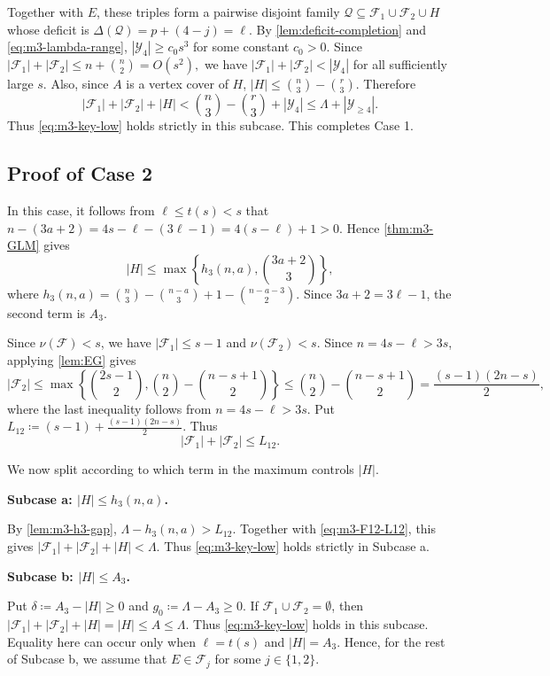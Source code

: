 \documentclass[10pt,a4paper]{article}
\numberwithin{equation}{section}
\theoremstyle{definition}
\newcommand{\F}{\mathcal F}
\newcommand{\Y}{\mathcal Y}
\begin{document}
Together with \(E\), these triples form a pairwise disjoint family
\(\mathcal Q\subseteq\F_1\cup\F_2\cup H\) whose deficit is
\(\Delta(\mathcal Q)=p+(4-j)=\ell.\)
By \cref{lem:deficit-completion} and \eqref{eq:m3-lambda-range},
\(|\Y_4|\ge c_0s^3\) for some constant \(c_0>0\).  Since
\(|\F_1|+|\F_2| \le n+\binom n2 =O(s^2),\)
we have \(|\F_1|+|\F_2|<|\Y_4|\) for all sufficiently large \(s\).  Also,
since \(A\) is a vertex cover of \(H\),
\(|H|\le \binom n3-\binom r3.\)
Therefore
\[
    |\F_1|+|\F_2|+|H|
    <
    \binom n3-\binom r3+|\Y_4|
    \le
    \Lambda+|\Y_{\ge4}|.
\]
Thus \eqref{eq:m3-key-low} holds strictly in this subcase.  This completes
Case 1.

\subsection{Proof of Case 2}

In this case, it follows from \(\ell\le t(s)<s\) that \(n-(3a+2) = 4s-\ell-(3\ell-1) = 4(s-\ell)+1>0\).
Hence \cref{thm:m3-GLM} gives
\[
    |H|
    \le
    \max\left\{
    h_3(n,a),\binom{3a+2}{3}
    \right\},
\]
where
\(h_3(n,a)= \binom n3-\binom{n-a}{3}+1-\binom{n-a-3}{2}.\)
Since \(3a+2=3\ell-1\), the second term is \(A_3\).

Since $\nu(\F)<s$, we have \(|\F_1|\le s-1\) and \(\nu(\F_2)<s\).
Since $n=4s-\ell>3s$, applying \cref{lem:EG} gives
\[
    |\F_2|
    \le
    \max\left\{\binom{2s-1}{2},\binom n2-\binom{n-s+1}{2}\right\}\le
    \binom n2-\binom{n-s+1}{2}
    =
    \frac{(s-1)(2n-s)}2,
\]
where the last inequality follows from \(n=4s-\ell>3s\).
Put
\(L_{12}\coloneqq (s-1)+\frac{(s-1)(2n-s)}2.\)
Thus
\begin{equation}\label{eq:m3-F12-L12}
    |\F_1|+|\F_2|\le L_{12}.
\end{equation}

We now split according to which term in the maximum controls \(|H|\).

\medskip
\noindent\textbf{Subcase a: \(|H|\le h_3(n,a)\).}
\medskip

By \cref{lem:m3-h3-gap},
\(\Lambda-h_3(n,a)>L_{12}.\)
Together with \eqref{eq:m3-F12-L12}, this gives
\(|\F_1|+|\F_2|+|H| < \Lambda.\)
Thus \eqref{eq:m3-key-low} holds strictly in Subcase a.

\medskip
\noindent\textbf{Subcase b: \(|H|\le A_3\).}
\medskip

Put
\(\delta\coloneqq A_3-|H|\ge0\) and \(g_0\coloneqq \Lambda-A_3\ge0\).
If \(\F_1\cup\F_2=\emptyset\), then $|\F_1|+|\F_2|+|H|=|H|\le A \le\Lambda$.
Thus \eqref{eq:m3-key-low} holds in this subcase.
Equality here can occur
only when \(\ell=t(s)\) and \(|H|=A_3\).
Hence, for the rest of Subcase b,
we assume that \(E\in\F_j\) for some \(j\in\{1,2\}\).
\end{document}
